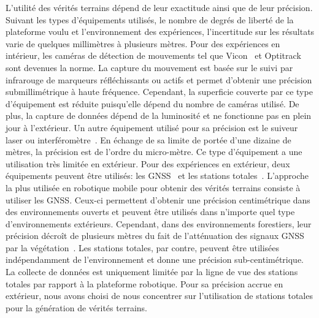 L'utilité des vérités terrains dépend de leur exactitude ainsi que de leur précision. 
Suivant les types d'équipements utilisés, le nombre de degrés de liberté de la plateforme voulu et l'environnement des expériences, l'incertitude sur les résultats varie de quelques millimètres à plusieurs mètres.
Pour des expériences en intérieur, les caméras de détection de mouvements tel que Vicon~\cite{Delmerico2018, Merriaux2017} et Optitrack~\cite{Furtado2019} sont devenues la norme.
La capture du mouvement est basée sur le suivi par infrarouge de marqueurs réfléchissants ou actifs et permet d'obtenir une précision submillimétrique à haute fréquence.
Cependant, la superficie couverte par ce type d'équipement est réduite puisqu'elle dépend du nombre de caméras utilisé.
De plus, la capture de données dépend de la luminosité et ne fonctionne pas en plein jour à l'extérieur.
Un autre équipement utilisé pour sa précision est le suiveur laser ou interféromètre~\cite{Sang2017}.
En échange de sa limite de portée d'une dizaine de mètres, la précision est de l'ordre du micro-mètre.
Ce type d'équipement a une utilisation très limitée en extérieur.
Pour des expériences en extérieur, deux équipements peuvent être utilisés: les \ac{GNSS}~\cite{Morales2007} et les stations totales~\cite{McGarey2018}.
L'approche la plus utilisée en robotique mobile pour obtenir des vérités terrains consiste à utiliser les \ac{GNSS}.
Ceux-ci permettent d'obtenir une précision centimétrique dans des environnements ouverts et peuvent être utilisés dans n'importe quel type d'environnements extérieurs.
Cependant, dans des environnements forestiers, leur précision décroît de plusieurs mètres du fait de l'atténuation des signaux \ac{GNSS} par la végétation~\cite{Kubelka2020}.
Les stations totales, par contre, peuvent être utilisées indépendamment de l'environnement et donne une précision sub-centimétrique.
La collecte de données est uniquement limitée par la ligne de vue des stations totales par rapport à la plateforme robotique.
Pour sa précision accrue en extérieur, nous avons choisi de nous concentrer sur l'utilisation de stations totales pour la génération de vérités terrains.

